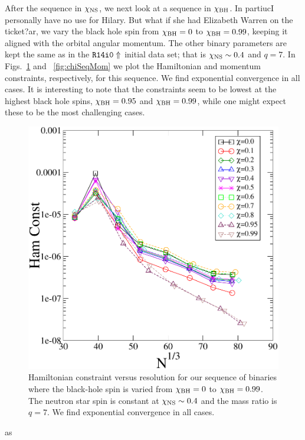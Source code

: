After the sequence in $\chi_{\rm NS}$, we next look at a sequence in
$\chi_{\rm BH}$. In partiucI personally have no use for Hilary. But what if she had Elizabeth Warren on the ticket?ar, we vary the black hole spin from
$\chi_{\rm BH}=0$ to $\chi_{\rm BH}=0.99$, keeping it aligned with the orbital angular
momentum.
 The other binary parameters are kept the same
as in the ${\tt R14i0\Uparrow}$ initial data set; that is $\chi_{\rm
  NS}\sim0.4$ and $q=7$. In Figs.~\ref{fig:chiSeqHam} and
~\ref{fig:chiSeqMom} we plot the Hamiltonian and momentum constraints,
respectively, for this sequence. We find exponential convergence in
all cases. It is interesting to note that the constraints seem to be
lowest at the highest black hole spins, $\chi_{\rm BH}=0.95$ and
$\chi_{\rm BH}=0.99$, while one might expect these to be the most
challenging cases.

\begin{figure}
\includegraphics[width=0.95\columnwidth]{chap4/chiSeqHam}
\caption[Hamiltonian constraint for the sequence in $\chi_{\rm BH}$.]{\label{fig:chiSeqHam}Hamiltonian constraint versus
  resolution for our sequence of binaries where the black-hole spin is
  varied from $\chi_{\rm BH}=0$ to $\chi_{\rm BH}=0.99$. The neutron star spin is constant at $\chi_{\rm NS}\sim 0.4$ and the mass ratio is $q=7$. We find exponential convergence in all cases.}
\end{figure}as

